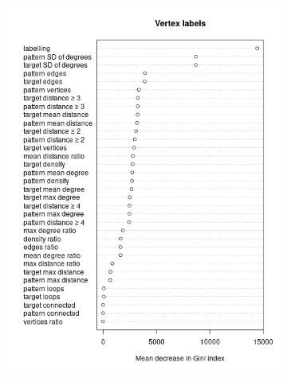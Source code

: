 \documentclass{l4proj}
\theoremstyle{definition}
\theoremstyle{remark}
\begin{document}
\begin{figure}
  \centering
  \begin{subfigure}[t]{0.49\textwidth}
    \centering
    \includegraphics[width=\textwidth]{images/vertex_labels_variable_importance.png}
  \end{subfigure}
  \begin{subfigure}[t]{0.49\textwidth}
    \centering

\end{subfigure}
\end{figure}
\end{document}
